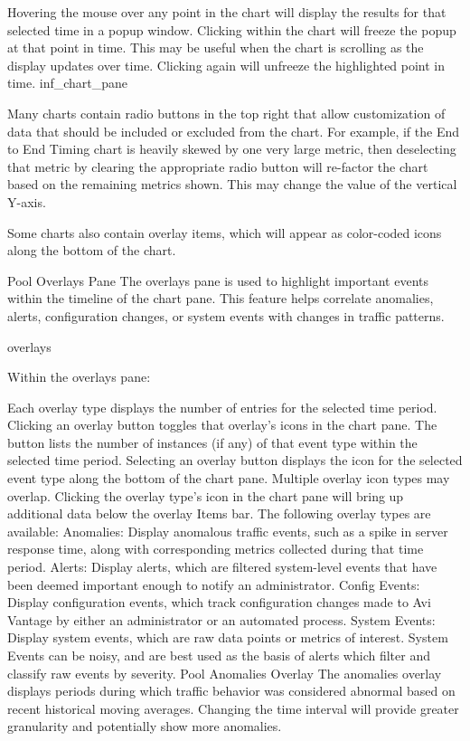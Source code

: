 \documentclass[letterpaper,10pt,english]{sphinxmanual}
\begin{document}
Hovering the mouse over any point in the chart will display the results for that selected time in a popup window.
Clicking within the chart will freeze the popup at that point in time. This may be useful when the chart is scrolling as the display updates over time.
Clicking again will unfreeze the highlighted point in time.
inf\_chart\_pane

Many charts contain radio buttons in the top right that allow customization of data that should be included or excluded from the chart. For example, if the End to End Timing chart is heavily skewed by one very large metric, then deselecting that metric by clearing the appropriate radio button will re-factor the chart based on the remaining metrics shown. This may change the value of the vertical Y-axis.

Some charts also contain overlay items, which will appear as color-coded icons along the bottom of the chart.

Pool Overlays Pane
The overlays pane is used to highlight important events within the timeline of the chart pane. This feature helps correlate anomalies, alerts, configuration changes, or system events with changes in traffic patterns.

overlays

Within the overlays pane:

Each overlay type displays the number of entries for the selected time period.
Clicking an overlay button toggles that overlay's icons in the chart pane. The button lists the number of instances (if any) of that event type within the selected time period.
Selecting an overlay button displays the icon for the selected event type along the bottom of the chart pane. Multiple overlay icon types may overlap. Clicking the overlay type's icon in the chart pane will bring up additional data below the overlay Items bar. The following overlay types are available:
Anomalies: Display anomalous traffic events, such as a spike in server response time, along with corresponding metrics collected during that time period.
Alerts: Display alerts, which are filtered system-level events that have been deemed important enough to notify an administrator.
Config Events: Display configuration events, which track configuration changes made to Avi Vantage by either an administrator or an automated process.
System Events: Display system events, which are raw data points or metrics of interest. System Events can be noisy, and are best used as the basis of alerts which filter and classify raw events by severity.
Pool Anomalies Overlay
The anomalies overlay displays periods during which traffic behavior was considered abnormal based on recent historical moving averages. Changing the time interval will provide greater granularity and potentially show more anomalies.
\end{document}
